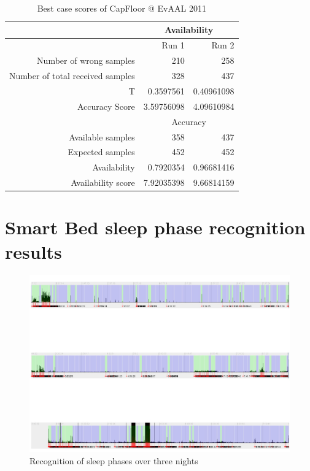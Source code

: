 \begin{table}[htbp]
  \centering
  \caption{Best case scores of CapFloor @ EvAAL 2011}
    \begin{tabular}{rrr}
    \toprule
          & \multicolumn{2}{c}{Availability} \\
    \midrule
          & Run 1 & Run 2 \\
    Number of wrong samples & 210   & 258 \\
    Number of total received samples & 328   & 437 \\
    T     & 0.3597561 & 0.40961098 \\
    Accuracy Score & 3.59756098 & 4.09610984 \\
        \midrule
          & \multicolumn{2}{c}{Accuracy} \\
    Available samples & 358   & 437 \\
    Expected samples & 452   & 452 \\
    Availability & 0.7920354 & 0.96681416 \\
    Availability score & 7.92035398 & 9.66814159 \\
    \bottomrule
    \end{tabular}%
  \label{tab:evalres_capfloor}%
\end{table}%

\section{Smart Bed sleep phase recognition results}
\begin{figure}[ht]
\centering
\includegraphics[width=1.0\textwidth]{images/eval_sleep_phase}
\caption{Recognition of sleep phases over three nights}
\label{fig:eval_sleep_phase}
\end{figure}



